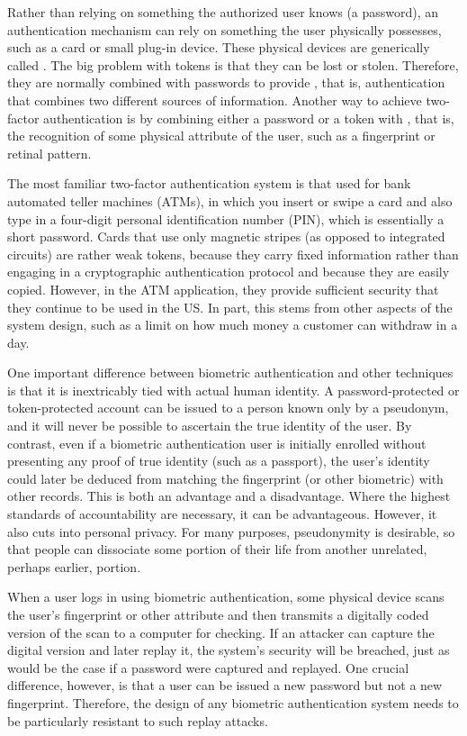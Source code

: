 Rather than relying on something the authorized user knows (a
password), an authentication mechanism can rely on something the user
physically possesses, such as a card or small plug-in device.  These
physical devices are generically called .  The big
problem with tokens is that they can be lost or stolen.  Therefore,
they are normally combined with passwords to provide
, that is, authentication that
combines two different sources of information.  Another way to achieve
two-factor authentication is by combining either a password or a token
with , that is, the recognition
of some physical attribute of the user, such as a fingerprint or
retinal pattern.

The most familiar two-factor authentication system is that used for
bank automated teller machines (ATMs), in which you insert or swipe a card
and also type in a four-digit personal
identification number (PIN), which is essentially a short password.
Cards that use only magnetic stripes (as opposed to integrated circuits) are rather weak tokens, because they carry
fixed information rather than engaging in a cryptographic
authentication protocol and because they are easily copied.  However,
in the ATM application, they provide sufficient security that they continue to be used in the US.  In part,
this stems from other aspects of the system design, such as a limit on
how much money a customer can withdraw in a day.

One important difference between biometric authentication and other
techniques is that it is inextricably tied with actual human
identity.  A password-protected or token-protected account can be
issued to a person known only by a pseudonym, and it will never be
possible to ascertain the true identity of the user.  By contrast,
even if a biometric authentication user is initially enrolled without
presenting any proof of true identity (such as a passport), the user's
identity could later be deduced from matching the fingerprint (or
other biometric) with other records.  This is both an advantage and a
disadvantage.  Where the highest standards of accountability are
necessary, it can be advantageous.  However, it also cuts into
personal privacy.  For many purposes, pseudonymity is desirable, so
that people can dissociate some portion of their life from another
unrelated, perhaps earlier, portion.

When a user logs in using biometric authentication, some physical
device scans the user's fingerprint or other attribute and then
transmits a digitally coded version of the scan to a computer for
checking.  If an attacker can capture the digital version and later
replay it, the system's security will be breached, just as would be
the case if a password were captured and replayed.  One crucial
difference, however, is that a user can be issued a new password but
not a new fingerprint.  Therefore, the design of any biometric
authentication system needs to be particularly resistant to such
replay attacks.

